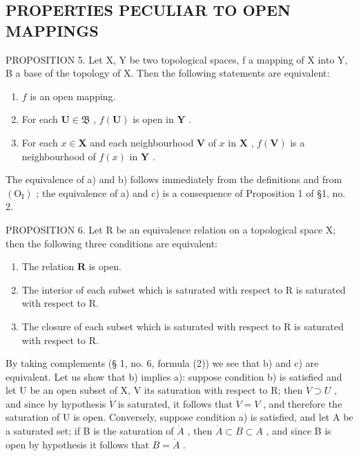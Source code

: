 \subsection{PROPERTIES PECULIAR TO OPEN MAPPINGS}

PROPOSITION 5. Let X, Y be two topological spaces, f a mapping of X into Y, B a base of the topology of X. Then the following statements are equivalent:

\begin{enumerate}
\def\labelenumi{\alph{enumi})}
\item
  \(f\) is an open mapping.
\item
  For each \(\mathbf{U} \in \mathfrak{B}\) , \(f(\mathbf{U})\) is open in \(\mathbf{Y}\) .
\item
  For each \(x \in \mathbf{X}\) and each neighbourhood \(\mathbf{V}\) of \(x\) in \(\mathbf{X}\) , \(f(\mathbf{V})\) is a neighbourhood of \(f(x)\) in \(\mathbf{Y}\) .
\end{enumerate}

The equivalence of a) and b) follows immediately from the definitions and from \((\mathrm{O}_{\mathrm{I}})\) ; the equivalence of a) and c) is a consequence of Proposition 1 of §1, no. 2.

PROPOSITION 6. Let R be an equivalence relation on a topological space X; then the following three conditions are equivalent:

\begin{enumerate}
\def\labelenumi{\alph{enumi})}
\item
  The relation \(\mathbf{R}\) is open.
\item
  The interior of each subset which is saturated with respect to R is saturated with respect to R.
\item
  The closure of each subset which is saturated with respect to R is saturated with respect to R.
\end{enumerate}

By taking complements (§ 1, no. 6, formula (2)) we see that b) and c) are equivalent. Let us show that b) implies a): suppose condition b) is satisfied and let U be an open subset of X, V its saturation with respect to R; then \(\dot{V} \supset U\) , and since by hypothesis \(\dot{V}\) is saturated, it follows that \(\dot{V} = V\) , and therefore the saturation of U is open. Conversely, suppose condition a) is satisfied, and let A be a saturated set; if B is the saturation of \(\mathring{A}\) , then \(\mathring{A} \subset B \subset A\) , and since B is open by hypothesis it follows that \(B = \mathring{A}\) .

